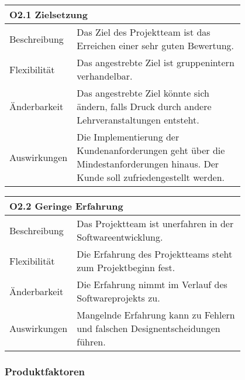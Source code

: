 {%
\begin{table}[htbp]
\centering
\begin{tabular}{|l|p{0.8\linewidth}|}
\hline
\multicolumn{2}{|l|}{\textbf{O2.1 Zielsetzung }}
  \tabularnewline \hline
Beschreibung                                               &  Das Ziel des Projektteam ist das Erreichen einer sehr guten Bewertung.                                                 \tabularnewline \hline
Flexibilität                                              & Das angestrebte Ziel ist gruppenintern verhandelbar.                                                                               \tabularnewline \hline
Änderbarkeit                                         & Das angestrebte Ziel könnte sich ändern, falls Druck durch andere Lehrveranstaltungen entsteht.                                                               \tabularnewline \hline
Auswirkungen                                                & Die Implementierung der Kundenanforderungen geht über die Mindestanforderungen hinaus. Der Kunde soll zufriedengestellt werden.                                    \tabularnewline \hline
 \hline
\end{tabular}
\end{table}



\centering
\begin{tabular}{|l|p{0.8\linewidth}|}
\hline
\multicolumn{2}{|l|}{\textbf{O2.2 Geringe Erfahrung}}
  \tabularnewline \hline
Beschreibung                                               &  Das Projektteam ist unerfahren in der Softwareentwicklung.                                                  \tabularnewline \hline
Flexibilität                                              & Die Erfahrung des Projektteams steht zum Projektbeginn fest.                                                                                \tabularnewline \hline
Änderbarkeit                                         & Die Erfahrung nimmt im Verlauf des Softwareprojekts zu.                                                               \tabularnewline \hline
Auswirkungen                                                & Mangelnde Erfahrung kann zu Fehlern und falschen Designentscheidungen führen.                                       \tabularnewline \hline
 \hline
\end{tabular}


\newpage

\flushleft
\subsubsection{Produktfaktoren}

}
